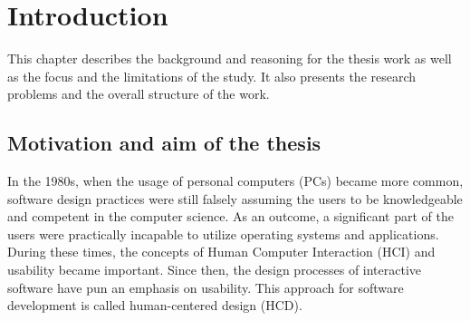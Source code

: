 \documentclass[12pt,a4paper,oneside,pdftex]{report}
\begin{document}


\label{pages-prelude}
\cleardoublepage

\startfirstchapter

\pagestyle{headings}


% 

\chapter{Introduction}
\label{chapter:introduction}
This chapter describes the background and reasoning for the thesis work as well as the focus and the limitations of the study. It also presents the research problems and the overall structure of the work. 

\section{Motivation and aim of the thesis}
\label{sec:motivationandaim}
In the 1980s, when the usage of personal computers (PCs) became more common, software design practices were still falsely assuming the users to be knowledgeable and competent in the computer science. As an outcome, a significant part of the users were practically incapable to utilize operating systems and applications. During these times, the concepts of Human Computer Interaction (HCI) and usability became important. Since then, the design processes of interactive software have pun an emphasis on usability. This approach for software development is called human-centered design (HCD). \citep{RefWorks:9}
\end{document}
